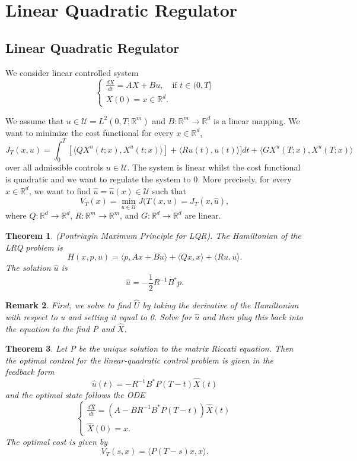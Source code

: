 \documentclass[twoside]{article}
\newcounter{lecnum}
\newtheorem{theorem}{Theorem}[lecnum]
\newtheorem{remark}[theorem]{Remark}
\begin{document}
\section{Linear Quadratic Regulator}
\subsection{Linear Quadratic Regulator}

We consider linear controlled system
$$
\begin{cases}
\frac{dX}{dt} = AX + Bu, \quad \text{if } t \in (0,T]\\
X(0) = x \in \mathbb{R}^d.
\end{cases}
$$

We assume that $u \in \mathcal{U} = L^2(0,T;\mathbb{R}^m)$ and $B: \mathbb{R}^m \rightarrow \mathbb{R}^d$ is a linear mapping. We want to minimize the cost functional for every $x \in \mathbb{R}^d$, 
$$
J_T(x,u) = \int_0^T[\langle QX^u(t;x), X^u(t;x) \rangle] + \langle Ru(t), u(t) \rangle]dt + \langle GX^u(T;x), X^u(T;x) \rangle
$$
over all admissible controls $u \in \mathcal{U}$. The system is linear whilst the cost functional is quadratic and we want to regulate the system to 0. More precisely, for every $x \in \mathbb{R}^d$, we want to find $\hat{u} = \hat{u}(x) \in \mathcal{U}$ such that
$$
V_T(x) = \min_{u \in \mathcal{U}}J(T(x,u) = J_T(x, \hat{u}),
$$
where $Q: \mathbb{R}^d \rightarrow \mathbb{R}^d$, $R: \mathbb{R}^m \rightarrow \mathbb{R}^m$, and $G: \mathbb{R}^d \rightarrow \mathbb{R}^d$ are linear.

\begin{theorem}(Pontriagin Maximum Principle for LQR). The Hamiltonian of the LRQ problem is 
$$
H(x,p,u) = \langle p, Ax + Bu \rangle + \langle Qx, x \rangle + \langle Ru, u \rangle.
$$
The solution $\hat{u}$ is 
$$
\hat{u} = -\frac{1}{2}R^{-1}B^*p.
$$
\end{theorem}

\begin{remark}First, we solve to find $\hat{U}$ by taking the derivative of the Hamiltonian with respect to u and setting it equal to 0. Solve for $\hat{u}$ and then plug this back into the equation to the find P and $\hat{X}$.
\end{remark}

\begin{theorem}Let P be the unique solution to the matrix Riccati equation. Then the optimal control for the linear-quadratic control problem is given in the feedback form 
$$
\hat{u}(t) = -R^{-1}B^*P(T-t)\hat{X}(t)
$$
and the optimal state follows the ODE 
$$
\begin{cases}
\frac{d\hat{X}}{dt} = (A - BR^{-1}B^*P(T-t))\hat{X}(t) \\
\hat{X}(0) = x.
\end{cases}$$
The optimal cost is given by 
$$
V_T(s,x) = \langle P(T-s)x, x \rangle.
$$

\end{theorem}
\end{document}
